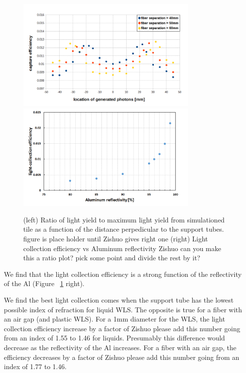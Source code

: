 \documentclass[review]{elsarticle}
\begin{document}
\begin{figure}[!ht]
\begin{center}
\includegraphics[width=0.8\textwidth]{./figures/geant_result_uniformity.png}
\includegraphics[width=0.8\textwidth]{./figures/geant_result_reflectivity.png}
\caption{(left) Ratio of light yield to maximum light yield from
  simulationed tile as a function of the distance perpedicular to the
  support tubes. {\color{red} figure is place holder until Zishuo
    gives right one} (right) Light collection efficiency vs Aluminum
  reflectivity {\color{red} Zishuo can you make this a ratio plot?
    pick some point and divide the rest by it?} }
\label{fig:simeff}
\end{center}
\end{figure}

We find that the light collection efficiency is a strong function of
the reflectivity of the Al (Figure ~\ref{fig:simeff} right).

We find the best light collection comes when the support tube has the
lowest possible index of refraction for liquid WLS. The opposite is
true for a fiber with an air gap (and plastic WLS). For a 1mm
diameter for the WLS, the light collection efficiency increase by a
factor of {\color{red} Zishuo please add this number} going from an
index of 1.55 to 1.46 for liquids. Presumably this difference would
decrease as the reflectivity of the Al increases. For a fiber with an
air gap, the efficiency decreases by a factor of {\color{red} Zishuo
 please add this number} going from an index of 1.77 to 1.46.
\end{document}
